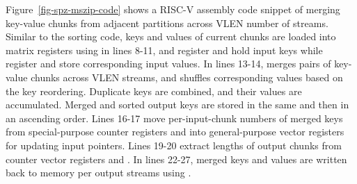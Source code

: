 Figure~\ref{fig-spz-mszip-code} shows a RISC-V assembly code snippet of merging
key-value chunks from adjacent partitions across VLEN number of streams.
Similar to the sorting code, keys and values of current chunks are loaded into
matrix registers using  in lines 8-11, and register  and
 hold input keys while register  and  store
corresponding input values.
In lines 13-14,  merges pairs of key-value chunks across VLEN
streams, and  shuffles corresponding values based on the key
reordering.
Duplicate keys are combined, and their values are accumulated.
Merged and sorted output keys are stored in the same  and then 
in an ascending order.
Lines 16-17 move per-input-chunk numbers of merged keys from special-purpose
counter registers  and  into general-purpose vector registers
for updating input pointers.
Lines 19-20 extract lengths of output chunks from counter vector registers
 and .
In lines 22-27, merged keys and values are written back to memory per output
streams using .
